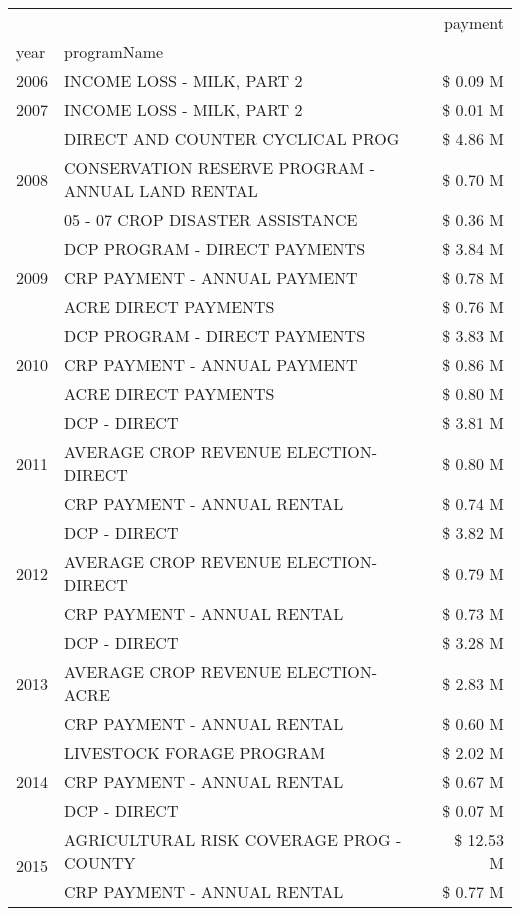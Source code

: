 \begin{tabular}{llr}
\toprule
 &  & payment \\
year & programName &  \\
\midrule
2006 & INCOME LOSS - MILK, PART 2 & \$ 0.09 M \\
\cline{1-3}
2007 & INCOME LOSS - MILK, PART 2 & \$ 0.01 M \\
\cline{1-3}
\multirow[t]{3}{*}{2008} & DIRECT AND COUNTER CYCLICAL PROG & \$ 4.86 M \\
 & CONSERVATION RESERVE PROGRAM - ANNUAL LAND RENTAL & \$ 0.70 M \\
 & 05 - 07 CROP DISASTER ASSISTANCE & \$ 0.36 M \\
\cline{1-3}
\multirow[t]{3}{*}{2009} & DCP PROGRAM - DIRECT PAYMENTS & \$ 3.84 M \\
 & CRP PAYMENT - ANNUAL PAYMENT & \$ 0.78 M \\
 & ACRE DIRECT PAYMENTS & \$ 0.76 M \\
\cline{1-3}
\multirow[t]{3}{*}{2010} & DCP PROGRAM - DIRECT PAYMENTS & \$ 3.83 M \\
 & CRP PAYMENT - ANNUAL PAYMENT & \$ 0.86 M \\
 & ACRE DIRECT PAYMENTS & \$ 0.80 M \\
\cline{1-3}
\multirow[t]{3}{*}{2011} & DCP - DIRECT & \$ 3.81 M \\
 & AVERAGE CROP REVENUE ELECTION-DIRECT & \$ 0.80 M \\
 & CRP PAYMENT - ANNUAL RENTAL & \$ 0.74 M \\
\cline{1-3}
\multirow[t]{3}{*}{2012} & DCP - DIRECT & \$ 3.82 M \\
 & AVERAGE CROP REVENUE ELECTION-DIRECT & \$ 0.79 M \\
 & CRP PAYMENT - ANNUAL RENTAL & \$ 0.73 M \\
\cline{1-3}
\multirow[t]{3}{*}{2013} & DCP - DIRECT & \$ 3.28 M \\
 & AVERAGE CROP REVENUE ELECTION-ACRE & \$ 2.83 M \\
 & CRP PAYMENT - ANNUAL RENTAL & \$ 0.60 M \\
\cline{1-3}
\multirow[t]{3}{*}{2014} & LIVESTOCK FORAGE PROGRAM & \$ 2.02 M \\
 & CRP PAYMENT - ANNUAL RENTAL & \$ 0.67 M \\
 & DCP - DIRECT & \$ 0.07 M \\
\cline{1-3}
\multirow[t]{3}{*}{2015} & AGRICULTURAL RISK COVERAGE PROG - COUNTY & \$ 12.53 M \\
 & CRP PAYMENT - ANNUAL RENTAL & \$ 0.77 M \\

\end{tabular}
